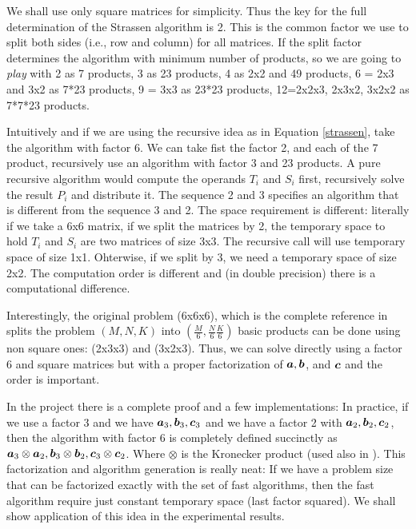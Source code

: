 \documentclass[acmsmall]{acmart}
\begin{document}
We shall use only square matrices for simplicity. Thus the key for the
full determination of the Strassen algorithm is 2. This is the common
factor we use to split both sides (i.e., row and column) for all
matrices. If the split factor determines the algorithm with minimum
number of products, so we are going to {\em play} with 2 as 7
products, 3 as 23 products, 4 as 2x2 and 49 products, 6 = 2x3 and 3x2
as 7*23 products, 9 = 3x3 as 23*23 products, 12=2x2x3, 2x3x2, 3x2x2 as
7*7*23 products.

Intuitively and if we are using the recursive idea as in Equation
\ref{strassen}, take the algorithm with factor 6. We can take fist the
factor 2, and each of the 7 product, recursively use an algorithm with
factor 3 and 23 products. A pure recursive algorithm would compute the
operands $T_i$ and $S_i$ first, recursively solve the result $P_i$ and
distribute it. The sequence 2 and 3 specifies an algorithm that is
different from the sequence 3 and 2.  The space requirement is
different: literally if we take a 6x6 matrix, if we split the matrices
by 2, the temporary space to hold $T_i$ and $S_i$ are two matrices of
size 3x3. The recursive call will use temporary space of size
1x1. Ohterwise, if we split by 3, we need a temporary space of size
2x2. The computation order is different and (in double precision)
there is a computational difference.

Interestingly, the original problem (6x6x6), which is the complete
reference in \cite{PMID:36198780} splits the problem $(M,N,K)$ into
$(\frac{M}{6},\frac{N}{6}\frac{K}{6})$ basic products can be done
using non square ones: (2x3x3) and (3x2x3). Thus, we can solve
directly using a factor 6 and square matrices but with a proper
factorization of ${\boldsymbol a},{\boldsymbol b}$, and ${\boldsymbol c}$ and the order is
important.

In the project there is a complete proof and a few implementations: In
practice, if we use a factor 3 and we have ${\boldsymbol a}_3, {\boldsymbol b}_3,
{\boldsymbol c}_3$ and we have a factor 2 with ${\boldsymbol a}_2, {\boldsymbol b}_2, {\boldsymbol c}_2$,
then the algorithm with factor 6 is completely defined succinctly as
${\boldsymbol a}_3 \otimes {\boldsymbol a}_2, {\boldsymbol b}_3 \otimes {\boldsymbol b}_2, {\boldsymbol c}_3
\otimes {\boldsymbol c}_2$. Where $\otimes$ is the Kronecker product (used also
in \cite{PMID:36198780}). This factorization and algorithm generation
is really neat: If we have a problem size that can be factorized
exactly with the set of fast algorithms, then the fast algorithm
require just constant temporary space (last factor squared). We shall
show application of this idea in the experimental results.
\end{document}
